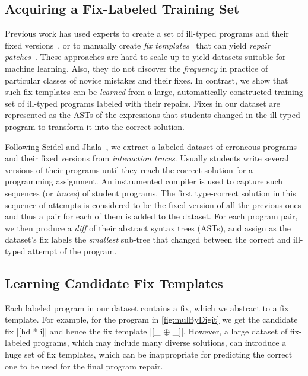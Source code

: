 \subsection{Acquiring a Fix-Labeled Training Set}
\label{sec:overview:data}

Previous work has used experts to create a set of ill-typed programs and their
fixed versions~\citep[][]{Lerner2007-dt, Loncaric2016-uk}, or to manually create
\emph{fix templates}~\cite{kim13par} that can yield \emph{repair
patches}~\citep[][]{martinez2013automatically,martinez2015mining}.
%
These approaches are hard to scale up to yield datasets suitable for machine
learning. Also, they do not discover the \emph{frequency} in practice of particular
classes of novice mistakes and their fixes.
%
In contrast, we show that such fix templates can be \emph{learned} from a large,
automatically constructed training set of ill-typed programs labeled with their
repairs.
%
Fixes in our dataset are represented as the ASTs of the expressions that students
changed in the ill-typed program to transform it into the correct solution.

Following Seidel and Jhala~\citep{Seidel:2017}, we extract a labeled
dataset of erroneous programs
and their fixed versions from \emph{interaction traces}. Usually students write
several versions of their programs until they reach the correct solution for a
programming assignment. An instrumented compiler is used to capture such
sequences (or \emph{traces}) of student programs. The first type-correct
solution in this sequence of attempts is considered to be the fixed
version of all the previous ones and thus a pair for each of them is added to
the dataset. For each program pair, we then produce a \emph{diff} of their
abstract syntax trees (ASTs), and assign as the dataset's fix labels the
\emph{smallest} sub-tree that changed between the correct and ill-typed attempt
of the program.


\subsection{Learning Candidate Fix Templates}
\label{sec:overview:learn}

Each labeled program in our dataset contains a fix, which we abstract to a fix
template. For example, for the \mbd program in \autoref{fig:mulByDigit} we get
the candidate fix |[hd * i]| and hence the fix template |[_ $\oplus$ _]|.
However, a large dataset of fix-labeled programs, which may include many diverse
solutions, can introduce a huge set of fix templates, which can be inappropriate
for predicting the correct one to be used for the final program repair.

